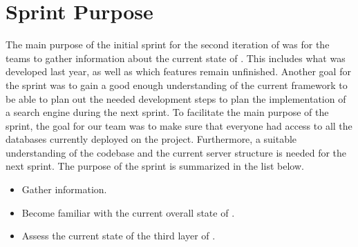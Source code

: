 \section{Sprint Purpose}
The main purpose of the initial sprint for the second iteration of \knox{} was for the teams to gather information about the current state of \knox{}.
This includes what was developed last year, as well as which features remain unfinished. 
Another goal for the sprint was to gain a good enough understanding of the current framework to be able to plan out the needed development steps to plan the implementation of a search engine during the next sprint. 
To facilitate the main purpose of the sprint, the goal for our team was to make sure that everyone had access to all the databases currently deployed on the \knox{} project. 
Furthermore, a suitable understanding of the codebase and the current server structure is needed for the next sprint.
The purpose of the sprint is summarized in the list below.

\begin{itemize}
    \item Gather information.
    \item Become familiar with the current overall state of \knox{}.
    \item Assess the current state of the third layer of \knox{}.
\end{itemize}